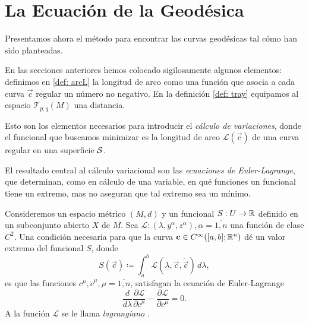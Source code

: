\section{La Ecuación de la Geodésica}
Presentamos ahora el método para encontrar las curvas geodésicas tal cómo han sido planteadas.

En las secciones anteriores hemos colocado sigilosamente algunos elementos: definimos en \ref{def: arcL} la longitud de arco como una función que asocia a cada curva $\vec c$ regular un número no negativo. En la definición \ref{def: tray} equipamos al espacio $\mathcal T_{p, q}(M)$ una distancia.

Esto son los elementos necesarios para introducir el \emph{cálculo de variaciones}, donde el funcional que buscamos minimizar es la longitud de arco $\mathscr L (\vec c)$ de una curva regular en una superficie $\mathcal S$.

El resultado central al cálculo variacional son las \emph{ecuaciones de Euler-Lagrange}, que determinan, como en cálculo de una variable, en qué funciones un funcional tiene un extremo, mas no aseguran que tal extremo sea un mínimo.

\begin{theorem}
	Consideremos un espacio métrico $(M, d)$ y un funcional $S : U \to \mathbb R$ definido en un subconjunto abierto $X$ de $M$.
	Sea $\mathcal L : (\lambda, y^\alpha, z^\alpha), \alpha = \overline{1, n}$ una función de clase $C^2$. Una condición necesaria para que la curva $\mathbf c \in C^\infty([a, b]; \mathbb R^n)$ dé un valor extremo del funcional $S$, donde
	\begin{equation}\label{eq: action}
		S(\vec c) \coloneqq \int_{a}^b \mathcal L(\lambda, \vec c, \dot{\vec c}) \, d\lambda,
	\end{equation}
	es que las funciones $c^\mu, \dot c^\mu, \mu = \overline{1, n}$, satisfagan la ecuación de Euler-Lagrange
	\begin{equation}
		\frac{d}{d\lambda}\frac{\partial \mathcal L}{\partial \dot c^\mu} - \frac{\partial \mathcal L}{\partial c^\mu} = 0.
	\end{equation}
	A la función $\mathcal L$ se le llama \emph{lagrangiano} \parencite{gelfand-1975}.
\end{theorem}

